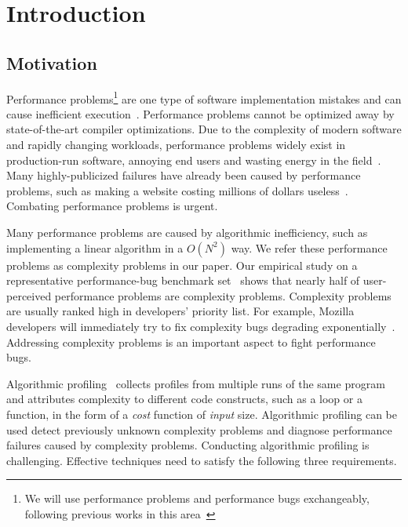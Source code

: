 \section{Introduction}
\label{sec:intro}

\subsection{Motivation}
\label{sec:motiv}

Performance problems\footnote{We will use performance problems and performance bugs exchangeably, 
following previous works in this area~\cite{SongOOPSLA2014,ldoctor}} 
are one type of software implementation mistakes
and can cause inefficient execution~\cite{PerfBug,perf.fse10,SongOOPSLA2014,ldoctor,Alabama}. 
Performance problems cannot be optimized away by state-of-the-art compiler optimizations.
Due to the complexity of modern software and rapidly changing workloads, 
performance problems widely exist in production-run software, 
annoying end users and wasting energy in the field~\cite{PerfBug,SongOOPSLA2014,ldoctor}. 
Many highly-publicized failures have already been caused by performance problems, 
such as making a website costing millions of dollars useless~\cite{ACA-health}.
Combating performance problems is urgent. 

Many performance problems are caused by algorithmic inefficiency, 
such as implementing a linear algorithm in a $O(N^2)$ way.
We refer these performance problems as complexity problems in our paper.
Our empirical study on a representative performance-bug 
benchmark set~\cite{PerfBug,SongOOPSLA2014} shows that 
nearly half of user-perceived performance problems are complexity problems. 
Complexity problems are usually ranked high in developers' priority list. 
For example, Mozilla developers will immediately try to fix complexity bugs degrading exponentially~\cite{mozilla35294}. 
Addressing complexity problems is an important aspect to fight performance bugs. 


Algorithmic profiling~\cite{Aprof1,Aprof2,AlgoProf} collects profiles from multiple 
runs of the same program and attributes complexity to different code constructs, such as a loop or a function,
in the form of a \textit{cost} function of \textit{input} size. 
Algorithmic profiling can be used detect previously unknown complexity problems and 
diagnose performance failures caused by complexity problems. 
Conducting algorithmic profiling is challenging. 
Effective techniques need to satisfy the following three requirements.


